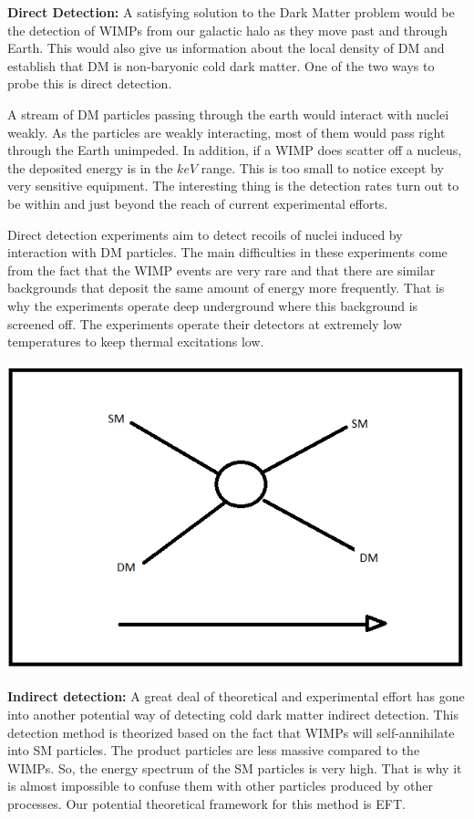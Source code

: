 \documentclass[12pt]{report}
\begin{document}
\textbf{Direct Detection:} A satisfying solution to the Dark Matter problem would be the detection of WIMPs from our galactic halo as they move past and through Earth. This would also give us information about the local density of DM and establish that DM is non-baryonic cold dark matter. One of the two ways to probe this is direct detection.

A stream of DM particles passing through the earth would interact with nuclei weakly. As the particles are weakly interacting, most of them would pass right through the Earth unimpeded. In addition, if a WIMP does scatter off a nucleus, the deposited energy is in the $keV$ range. This is too small to notice except by very sensitive equipment. The interesting thing is the detection rates turn out to be within and just beyond the reach of current experimental efforts. 

Direct detection experiments aim to detect recoils of nuclei induced by interaction with DM particles. The main difficulties in these experiments come from the fact that the WIMP events are very rare and that there are similar backgrounds that deposit the same amount of energy more frequently. That is why the experiments operate deep underground where this background is screened off. The experiments operate their detectors at extremely low temperatures to keep thermal excitations low.

\begin{center}
\includegraphics[scale=0.3]{Direct_detection1.png}
\end{center}

\textbf{Indirect detection:} A great deal of theoretical and experimental effort has gone into another potential way of detecting cold dark matter indirect detection. This detection method is theorized based on the fact that WIMPs will self-annihilate into SM particles. The product particles are less massive compared to the WIMPs. So, the energy spectrum of the SM particles is very high. That is why it is almost impossible to confuse them with other particles produced by other processes. Our potential theoretical framework for this method is EFT. 
\end{document}
